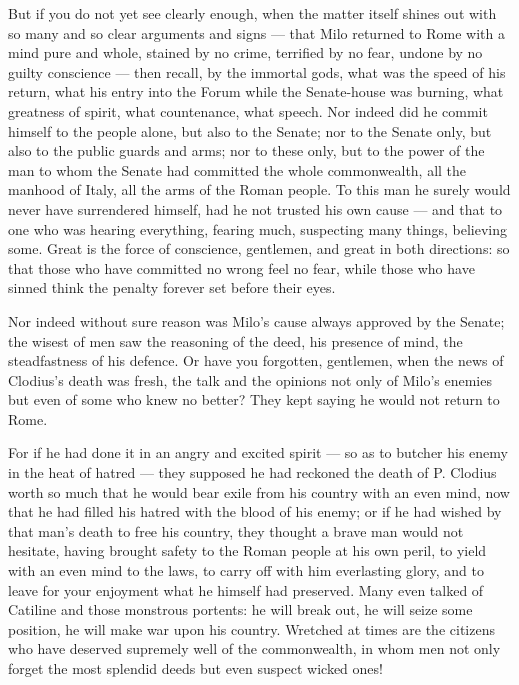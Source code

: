  But if you do not yet see clearly enough, when the matter itself shines out with so many and so clear arguments and signs --- that Milo returned to Rome with a mind pure and whole, stained by no crime, terrified by no fear, undone by no guilty conscience --- then recall, by the immortal gods, what was the speed of his return, what his entry into the Forum while the Senate-house was burning, what greatness of spirit, what countenance, what speech. Nor indeed did he commit himself to the people alone, but also to the Senate; nor to the Senate only, but also to the public guards and arms; nor to these only, but to the power of the man to whom the Senate had committed the whole commonwealth, all the manhood of Italy, all the arms of the Roman people. To this man he surely would never have surrendered himself, had he not trusted his own cause --- and that to one who was hearing everything, fearing much, suspecting many things, believing some. Great is the force of conscience, gentlemen, and great in both directions: so that those who have committed no wrong feel no fear, while those who have sinned think the penalty forever set before their eyes.

 Nor indeed without sure reason was Milo's cause always approved by the Senate; the wisest of men saw the reasoning of the deed, his presence of mind, the steadfastness of his defence. Or have you forgotten, gentlemen, when the news of Clodius's death was fresh, the talk and the opinions not only of Milo's enemies but even of some who knew no better? They kept saying he would not return to Rome.

 For if he had done it in an angry and excited spirit --- so as to butcher his enemy in the heat of hatred --- they supposed he had reckoned the death of P. Clodius worth so much that he would bear exile from his country with an even mind, now that he had filled his hatred with the blood of his enemy; or if he had wished by that man's death to free his country, they thought a brave man would not hesitate, having brought safety to the Roman people at his own peril, to yield with an even mind to the laws, to carry off with him everlasting glory, and to leave for your enjoyment what he himself had preserved. Many even talked of Catiline and those monstrous portents: he will break out, he will seize some position, he will make war upon his country. Wretched at times are the citizens who have deserved supremely well of the commonwealth, in whom men not only forget the most splendid deeds but even suspect wicked ones!

